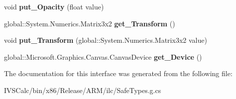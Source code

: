 \begin{DoxyCompactItemize}
void {\bfseries put\+\_\+\+Opacity} (float value)
\item 
\mbox{\label{interface_microsoft_1_1_graphics_1_1_canvas_1_1_brushes_1_1_i_canvas_brush_ac6954f3f6998acc0ddd2808d6cfce904}} 
global\+::\+System.\+Numerics.\+Matrix3x2 {\bfseries get\+\_\+\+Transform} ()
\item 
\mbox{\label{interface_microsoft_1_1_graphics_1_1_canvas_1_1_brushes_1_1_i_canvas_brush_a9adcd284f7120dad77434dd854ea0463}} 
void {\bfseries put\+\_\+\+Transform} (global\+::\+System.\+Numerics.\+Matrix3x2 value)
\item 
\mbox{\label{interface_microsoft_1_1_graphics_1_1_canvas_1_1_brushes_1_1_i_canvas_brush_a41d4519edbed7f35d120948345865ecb}} 
global\+::\+Microsoft.\+Graphics.\+Canvas.\+Canvas\+Device {\bfseries get\+\_\+\+Device} ()
\end{DoxyCompactItemize}


The documentation for this interface was generated from the following file\+:\begin{DoxyCompactItemize}
\item 
I\+V\+S\+Calc/bin/x86/\+Release/\+A\+R\+M/ilc/Safe\+Types.\+g.\+cs\end{DoxyCompactItemize}
